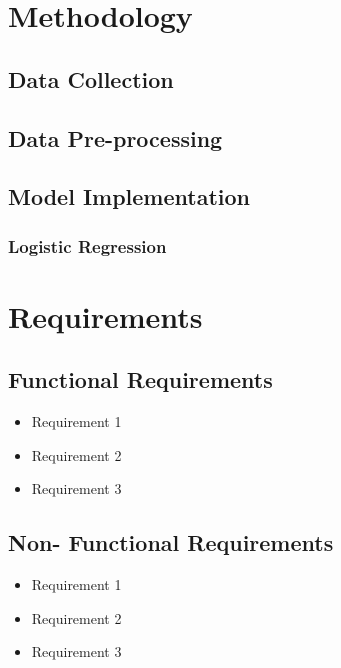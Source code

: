 \documentclass[ 12pt,a4paper,twocolumn,fleqn]{article}
\begin{document}
\section{Methodology}

\subsection{Data Collection}

\subsection{Data Pre-processing}

\subsection{Model Implementation}

\subsubsection{Logistic Regression}

\section{Requirements}

\subsection{Functional Requirements}
\begin{itemize}
\item Requirement 1
\item Requirement 2
\item Requirement 3
\end{itemize}


\subsection{Non- Functional Requirements}
\begin{itemize}
\item Requirement 1
\item Requirement 2
\item Requirement 3
\end{itemize}

\clearpage

\newpage
 \pagestyle{fancy}
\thisfancypage{%
  \setlength{\fboxsep}{20pt}\doublebox}{}
\end{document}
